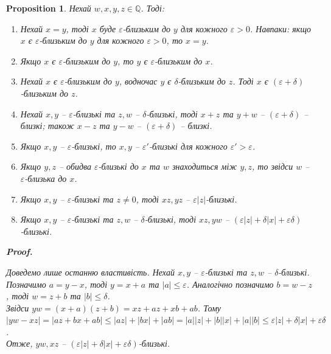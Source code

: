 \documentclass[a4paper, 14pt]{extarticle}
\makeatletter
\theoremstyle{theoremdd}
\theoremstyle{theoremdd}
\theoremstyle{theoremdd}
\theoremstyle{theoremdd}
\theoremstyle{theoremdd}
\theoremstyle{theoremdd}
\theoremstyle{theoremdd}
\theoremstyle{theoremdd}
\theoremstyle{theoremdd}
\theoremstyle{theoremdd}
\newtheorem{proposition}[theorem]{Proposition}
\theoremstyle{theoremdd}
\theoremstyle{theoremdd}
\theoremstyle{theoremdd}
\theoremstyle{theoremdd}
\theoremstyle{theoremdd}
\theoremstyle{theoremdd}
\renewenvironment{proof}[1][Proof.\\]{\par
\pushQED{\hfill \qed}%
\normalfont \topsep6\p@\@plus6\p@\relax
\trivlist
\item\relax
{\bfseries
#1\@addpunct{.}}\hspace\labelsep\ignorespaces
}{%
\popQED\endtrivlist\@endpefalse
}
\makeatother
\begin{document}
\begin{proposition}
Нехай $w,x,y,z \in \mathbb{Q}$. Тоді:
\begin{enumerate}[nosep,wide=0pt,label={\arabic*)}]
\item Нехай $x = y$, тоді $x$ буде $\varepsilon$-близьким до $y$ для кожного $\varepsilon > 0$. Навпаки: якщо $x$ є $\varepsilon$-близьким до $y$ для кожного $\varepsilon > 0$, то $x = y$.

\item Якщо $x$ є $\varepsilon$-близьким до $y$, то $y$ є $\varepsilon$-близьким до $x$.

\item Нехай $x$ є $\varepsilon$-близьким до $y$, водночас $y$ є $\delta$-близьким до $z$. Тоді $x$ є $(\varepsilon+\delta)$-близьким до $z$.

\item Нехай $x,y$ -- $\varepsilon$-близькі та $z,w$ -- $\delta$-близькі, тоді $x+z$ та $y+w$ -- $(\varepsilon+\delta)$ -- близкі; також $x-z$ та $y-w$ -- $(\varepsilon+\delta)$ -- близкі.

\item Якщо $x,y$ -- $\varepsilon$-близькі, то $x,y$ -- $\varepsilon'$-близькі для кожного $\varepsilon' > \varepsilon$.

\item Якщо $y,z$ -- обидва $\varepsilon$-близькі до $x$ та $w$ знаходиться між $y,z$, то звідси $w$ -- $\varepsilon$-близька до $x$.

\item Якщо $x,y$ -- $\varepsilon$-близькі та $z \neq 0$, тоді $xz,yz$ -- $\varepsilon |z|$-близькі. 

\item Якщо $x,y$ -- $\varepsilon$-близькі та $z,w$ -- $\delta$-близькі, тоді $xz,yw$ -- $(\varepsilon |z| + \delta |x| + \varepsilon \delta)$-близькі.
\end{enumerate}

\begin{proof}
Доведемо лише останню властивість. Нехай $x,y$ -- $\varepsilon$-близькі та $z,w$ -- $\delta$-близькі. Позначимо $a = y-x$, тоді $y = x+a$ та $|a| \leq \varepsilon$. Аналогічно позначимо $b = w-z$, тоді $w = z+b$ та $|b| \leq \delta$.\\
Звідси $yw = (x+a)(z+b) = xz + az + xb + ab$. Тому\\
$|yw - xz| = |az + bx + ab| \leq |az| + |bx| + |ab| = |a||z| + |b||x| + |a||b| \leq \varepsilon |z| + \delta |x| + \varepsilon \delta$.\\
Отже, $yw,xz$ -- $(\varepsilon |z| + \delta |x| + \varepsilon \delta)$-близькі.
\end{proof}
\end{proposition}
\end{document}
